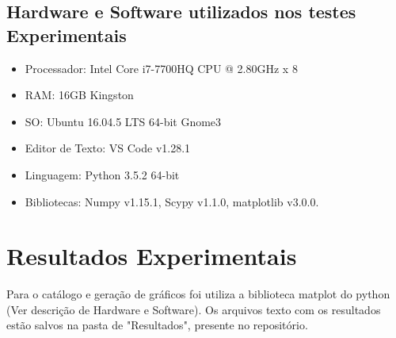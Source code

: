 \documentclass[10pt,a4paper]{article}
\begin{document}
    \subsection{Hardware e Software utilizados nos testes Experimentais}
        \begin{flushleft}
            \begin{itemize}
            \item Processador: Intel Core i7-7700HQ CPU @ 2.80GHz x 8 
            \item RAM: 16GB Kingston
            \item SO: Ubuntu 16.04.5 LTS 64-bit Gnome3
            \item Editor de Texto: VS Code v1.28.1
            \item Linguagem: Python 3.5.2 64-bit
            \item Bibliotecas: Numpy v1.15.1, Scypy v1.1.0, matplotlib v3.0.0.
        \end{itemize}
        \end{flushleft}

\newpage
\section{Resultados Experimentais}
    \indent Para o catálogo e geração de gráficos foi utiliza a biblioteca matplot do python (Ver descrição de Hardware e Software). Os arquivos texto com os resultados estão salvos na pasta de "Resultados", presente no repositório.
\end{document}
